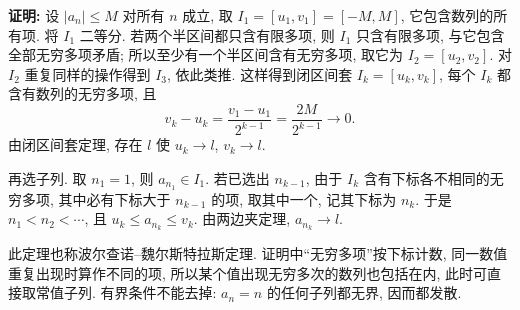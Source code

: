 \documentclass[UTF8,openany]{ctexbook}
\theoremstyle{chinesetextbook}
\newenvironment{cnproof}{\par\indent\textbf{证明:} \ignorespaces}{\par}
\begin{document}
\begin{cnproof}
设 $|a_n|\le M$ 对所有 $n$ 成立, 取 $I_1=[u_1,v_1]=[-M,M]$, 它包含数列的所有项. 将 $I_1$ 二等分. 若两个半区间都只含有限多项, 则 $I_1$ 只含有限多项, 与它包含全部无穷多项矛盾; 所以至少有一个半区间含有无穷多项, 取它为 $I_2=[u_2,v_2]$. 对 $I_2$ 重复同样的操作得到 $I_3$, 依此类推. 这样得到闭区间套 $I_k=[u_k,v_k]$, 每个 $I_k$ 都含有数列的无穷多项, 且
\[
v_k-u_k=\frac{v_1-u_1}{2^{k-1}}=\frac{2M}{2^{k-1}}\to0.
\]
由闭区间套定理, 存在 $l$ 使 $u_k\to l$, $v_k\to l$.

再选子列. 取 $n_1=1$, 则 $a_{n_1}\in I_1$. 若已选出 $n_{k-1}$, 由于 $I_k$ 含有下标各不相同的无穷多项, 其中必有下标大于 $n_{k-1}$ 的项, 取其中一个, 记其下标为 $n_k$. 于是 $n_1<n_2<\cdots$, 且 $u_k\le a_{n_k}\le v_k$. 由两边夹定理, $a_{n_k}\to l$.
\end{cnproof}
此定理也称波尔查诺--魏尔斯特拉斯定理. 证明中“无穷多项”按下标计数, 同一数值重复出现时算作不同的项, 所以某个值出现无穷多次的数列也包括在内, 此时可直接取常值子列. 有界条件不能去掉: $a_n=n$ 的任何子列都无界, 因而都发散.
\end{document}
